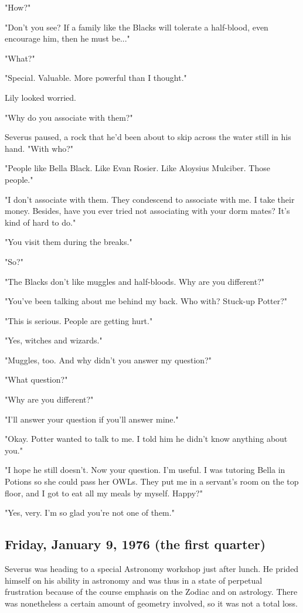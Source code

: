 \documentclass[a4paper,11pt]{article}
\begin{document}
"How?"

"Don't you see? If a family like the Blacks will tolerate a half-blood, even encourage him, then he must be..."

"What?"

"Special. Valuable. More powerful than I thought."

Lily looked worried.

"Why do you associate with them?"

Severus paused, a rock that he'd been about to skip across the water still in his hand. "With who?"

"People like Bella Black. Like Evan Rosier. Like Aloysius Mulciber. Those people."

"I don't associate with them. They condescend to associate with me. I take their money. Besides, have you ever tried not associating with your dorm mates? It's kind of hard to do."

"You visit them during the breaks."

"So?"

"The Blacks don't like muggles and half-bloods. Why are you different?"

"You've been talking about me behind my back. Who with? Stuck-up Potter?"

"This is serious. People are getting hurt."

"Yes, witches and wizards."

"Muggles, too. And why didn't you answer my question?"

"What question?"

"Why are you different?"

"I'll answer your question if you'll answer mine."

"Okay. Potter wanted to talk to me. I told him he didn't know anything about you."

"I hope he still doesn't. Now your question. I'm useful. I was tutoring Bella in Potions so she could pass her OWLs. They put me in a servant's room on the top floor, and I got to eat all my meals by myself. Happy?"

"Yes, very. I'm so glad you're not one of them."

\subsection{Friday, January 9, 1976 (the first quarter)}

Severus was heading to a special Astronomy workshop just after lunch. He prided himself on his ability in astronomy and was thus in a state of perpetual frustration because of the course emphasis on the Zodiac and on astrology. There was nonetheless a certain amount of geometry involved, so it was not a total loss.
\end{document}
